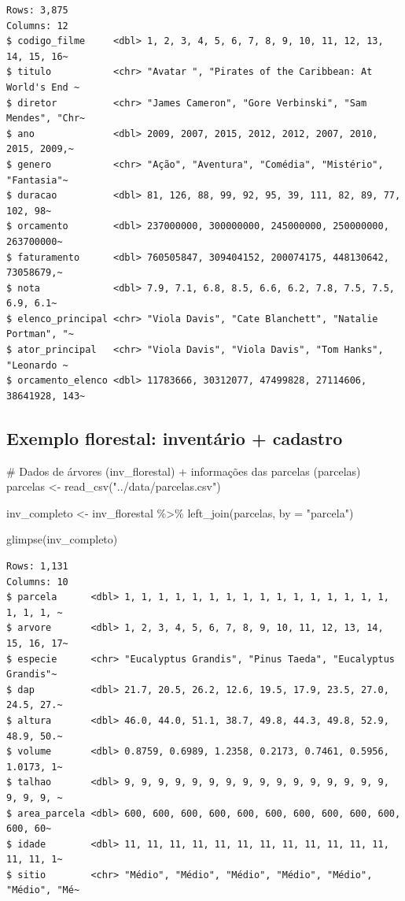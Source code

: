 \documentclass[
  letterpaper,
]{scrbook}
\newenvironment{Shaded}{\begin{snugshade}}{\end{snugshade}}
\newcommand{\AttributeTok}[1]{\textcolor[rgb]{0.40,0.45,0.13}{#1}}
\newcommand{\CommentTok}[1]{\textcolor[rgb]{0.37,0.37,0.37}{#1}}
\newcommand{\FunctionTok}[1]{\textcolor[rgb]{0.28,0.35,0.67}{#1}}
\newcommand{\NormalTok}[1]{\textcolor[rgb]{0.00,0.23,0.31}{#1}}
\newcommand{\OtherTok}[1]{\textcolor[rgb]{0.00,0.23,0.31}{#1}}
\newcommand{\SpecialCharTok}[1]{\textcolor[rgb]{0.37,0.37,0.37}{#1}}
\newcommand{\StringTok}[1]{\textcolor[rgb]{0.13,0.47,0.30}{#1}}
\begin{document}
\begin{verbatim}
Rows: 3,875
Columns: 12
$ codigo_filme     <dbl> 1, 2, 3, 4, 5, 6, 7, 8, 9, 10, 11, 12, 13, 14, 15, 16~
$ titulo           <chr> "Avatar ", "Pirates of the Caribbean: At World's End ~
$ diretor          <chr> "James Cameron", "Gore Verbinski", "Sam Mendes", "Chr~
$ ano              <dbl> 2009, 2007, 2015, 2012, 2012, 2007, 2010, 2015, 2009,~
$ genero           <chr> "Ação", "Aventura", "Comédia", "Mistério", "Fantasia"~
$ duracao          <dbl> 81, 126, 88, 99, 92, 95, 39, 111, 82, 89, 77, 102, 98~
$ orcamento        <dbl> 237000000, 300000000, 245000000, 250000000, 263700000~
$ faturamento      <dbl> 760505847, 309404152, 200074175, 448130642, 73058679,~
$ nota             <dbl> 7.9, 7.1, 6.8, 8.5, 6.6, 6.2, 7.8, 7.5, 7.5, 6.9, 6.1~
$ elenco_principal <chr> "Viola Davis", "Cate Blanchett", "Natalie Portman", "~
$ ator_principal   <chr> "Viola Davis", "Viola Davis", "Tom Hanks", "Leonardo ~
$ orcamento_elenco <dbl> 11783666, 30312077, 47499828, 27114606, 38641928, 143~
\end{verbatim}

\subsection{Exemplo florestal: inventário +
cadastro}\label{exemplo-florestal-inventuxe1rio-cadastro}

\begin{Shaded}
\begin{Highlighting}[]
\CommentTok{\# Dados de árvores (inv\_florestal) + informações das parcelas (parcelas)}
\NormalTok{parcelas }\OtherTok{\textless{}{-}} \FunctionTok{read\_csv}\NormalTok{(}\StringTok{"../data/parcelas.csv"}\NormalTok{)}

\NormalTok{inv\_completo }\OtherTok{\textless{}{-}}\NormalTok{ inv\_florestal }\SpecialCharTok{\%\textgreater{}\%} 
  \FunctionTok{left\_join}\NormalTok{(parcelas, }\AttributeTok{by =} \StringTok{"parcela"}\NormalTok{)}

\FunctionTok{glimpse}\NormalTok{(inv\_completo)}
\end{Highlighting}
\end{Shaded}

\begin{verbatim}
Rows: 1,131
Columns: 10
$ parcela      <dbl> 1, 1, 1, 1, 1, 1, 1, 1, 1, 1, 1, 1, 1, 1, 1, 1, 1, 1, 1, ~
$ arvore       <dbl> 1, 2, 3, 4, 5, 6, 7, 8, 9, 10, 11, 12, 13, 14, 15, 16, 17~
$ especie      <chr> "Eucalyptus Grandis", "Pinus Taeda", "Eucalyptus Grandis"~
$ dap          <dbl> 21.7, 20.5, 26.2, 12.6, 19.5, 17.9, 23.5, 27.0, 24.5, 27.~
$ altura       <dbl> 46.0, 44.0, 51.1, 38.7, 49.8, 44.3, 49.8, 52.9, 48.9, 50.~
$ volume       <dbl> 0.8759, 0.6989, 1.2358, 0.2173, 0.7461, 0.5956, 1.0173, 1~
$ talhao       <dbl> 9, 9, 9, 9, 9, 9, 9, 9, 9, 9, 9, 9, 9, 9, 9, 9, 9, 9, 9, ~
$ area_parcela <dbl> 600, 600, 600, 600, 600, 600, 600, 600, 600, 600, 600, 60~
$ idade        <dbl> 11, 11, 11, 11, 11, 11, 11, 11, 11, 11, 11, 11, 11, 11, 1~
$ sitio        <chr> "Médio", "Médio", "Médio", "Médio", "Médio", "Médio", "Mé~
\end{verbatim}
\end{document}
